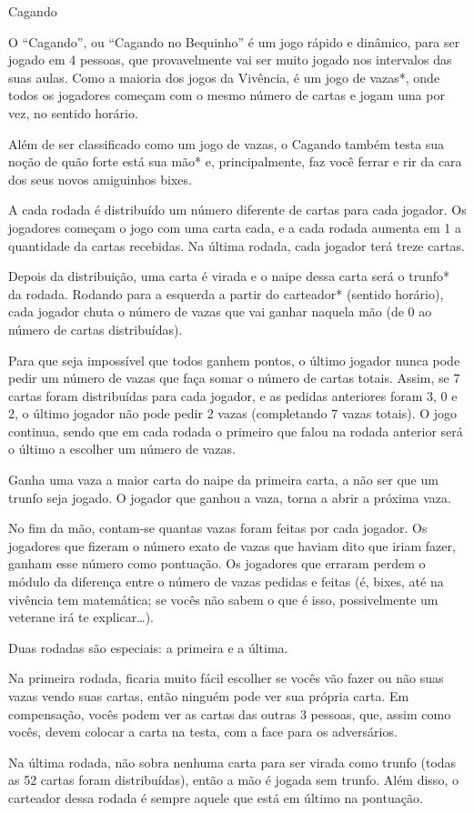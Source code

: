 \begin{subsecao}{Cagando}

O ``Cagando'', ou ``Cagando no Bequinho'' é um jogo rápido e dinâmico, para ser
jogado em 4 pessoas, que provavelmente vai ser muito jogado nos intervalos das
suas aulas. Como a maioria dos jogos da Vivência, é um jogo de vazas*, onde todos
os jogadores começam com o mesmo número de cartas e jogam uma por vez, no sentido horário.

Além de ser classificado como um jogo de vazas, o Cagando também testa sua noção
de quão forte está sua mão* e, principalmente, faz você ferrar e rir da
cara dos seus novos amiguinhos bixes.

A cada rodada é distribuído um número diferente de cartas para cada jogador. Os
jogadores começam o jogo com uma carta cada, e a cada rodada aumenta em 1 a
quantidade da cartas recebidas. Na última rodada, cada jogador terá treze cartas.

Depois da distribuição, uma carta é virada e o naipe dessa carta será o trunfo*
da rodada. Rodando para a esquerda a partir do carteador* (sentido horário), cada
jogador chuta o número de vazas que vai ganhar naquela mão (de 0 ao número de cartas
distribuídas).

Para que seja impossível que todos ganhem pontos, o último jogador nunca pode
pedir um número de vazas que faça somar o número de cartas totais. Assim, se 7
cartas foram distribuídas para cada jogador, e as pedidas anteriores foram 3, 0
e 2, o último jogador não pode pedir 2 vazas (completando 7 vazas totais). O
jogo continua, sendo que em cada rodada o primeiro que falou na rodada anterior
será o último a escolher um número de vazas.

Ganha uma vaza a maior carta do naipe da primeira carta, a não ser que um
trunfo seja jogado. O jogador que ganhou a vaza, torna a abrir a próxima vaza. 

No fim da mão, contam-se quantas vazas foram feitas por cada
jogador. Os jogadores que fizeram o número exato de vazas que haviam
dito que iriam fazer, ganham esse número como pontuação. Os jogadores
que erraram perdem o módulo da diferença entre o número de vazas pedidas e feitas
(é, bixes, até na vivência tem matemática; se vocês não sabem o que é isso,
possivelmente um veterane irá te explicar\dots).

Duas rodadas são especiais: a primeira e a última. 

Na primeira rodada, ficaria muito fácil escolher se vocês vão fazer ou não suas
vazas vendo suas cartas, então ninguém pode ver sua própria carta. Em
compensação, vocês podem ver as cartas das outras 3 pessoas, que, assim como
vocês, devem colocar a carta na testa, com a face para os adversários.

Na última rodada, não sobra nenhuma carta para ser virada como trunfo (todas
as 52 cartas foram distribuídas), então a mão é jogada sem trunfo. Além disso,
o carteador dessa rodada é sempre aquele que está em último na pontuação.

\end{subsecao}
